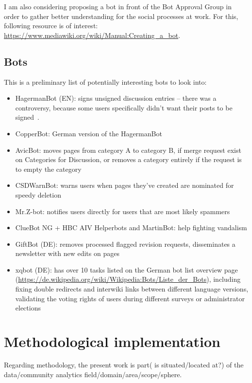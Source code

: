 \documentclass[pdftex,a4paper,11pt]{scrartcl}
\begin{document}
I am also considering proposing a bot in front of the Bot Approval Group in order to gather better understanding for the social processes at work.
For this, following resource is of interest: \url{https://www.mediawiki.org/wiki/Manual:Creating_a_bot}.

\subsection{Bots}

This is a preliminary list of potentially interesting bots to look into:

\begin{itemize}
  \item HagermanBot (EN): signs unsigned discussion entries -- there was a
  controversy, because some users specifically didn't want their posts to be
  signed~\cite{MueDoHer2013}. %
  \item CopperBot: German version of the HagermanBot
  \item AvicBot: moves pages from category A to category B, if merge request exist on Categories for Discussion, or removes a category entirely if the request is to empty the category
  \item CSDWarnBot: warns users when pages they've created are nominated for speedy deletion
  \item Mr.Z-bot: notifies users directly for users that are most likely spammers
  \item ClueBot NG + HBC AIV Helperbots and MartinBot: help fighting vandalism
  \item GiftBot (DE): removes processed flagged revision requests, disseminates a newsletter with new edits on pages
  \item xqbot (DE): has over 10 tasks listed on the German bot list overview page (\url{https://de.wikipedia.org/wiki/Wikipedia:Bots/Liste_der_Bots}), including fixing double redirects and interwiki links between different language versions, validating the voting rights of users during different surveys or administrator elections
\end{itemize}


\section{Methodological implementation}
Regarding methodology, the present work is part( is situated/located at?) of the data/community analytics field/domain/area/scope/sphere.
\end{document}
